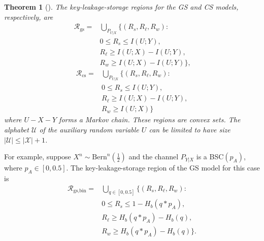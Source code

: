 \documentclass[journal,10pt,twoside]{IEEEtran}
\newtheorem{theorem}{Theorem}
\begin{document}
\begin{theorem}[\hspace{1sp}\cite{IgnaTrans}]\label{theo:secrecyregions}
The key-leakage-storage regions for the GS and CS models, respectively, are 
\begin{align}
\mathcal{R}_{\text{gs}}\! =\! &\bigcup_{P_{U|X}}\!\Big\{\left(R_s,R_\ell,R_w\right)\!\colon\!\nonumber\\
&0 \leq R_s\leq I(U;Y),\nonumber\\
&R_\ell\geq I(U;X)-I(U;Y),\nonumber\\
&R_w\geq I(U;X)-I(U;Y)\Big\} \text{,}\label{eq:regionGS}
\end{align}
\vspace*{-0.2cm}
\begin{align}
	\mathcal{R}_{\text{cs}}\! =\! &\bigcup_{P_{U|X}}\!\Big\{\left(R_s,R_\ell,R_w\right)\!\colon\! \nonumber\\
	&0 \leq R_s\leq I(U;Y),\nonumber\\
	&R_\ell\geq I(U;X)-I(U;Y),\nonumber\\
	&R_w\geq I(U;X)\Big\} \label{eq:regionCS}
\end{align}
where $U-X-Y$ forms a Markov chain. These regions are convex sets. The alphabet $\mathcal{U}$ of the auxiliary random variable $U$ can be limited to have size $\displaystyle |\mathcal{U}|\!\leq\!|\mathcal{X}|+1$.
\end{theorem}

For example, suppose $X^n\sim \text{Bern}^n(\frac{1}{2})$ and the channel $P_{Y|X}$ is a BSC$(p_A)$, where $p_A\in[0, 0.5]$. The key-leakage-storage region of the GS model for this case is \cite{IgnaTrans}
\begin{align}
\mathcal{R}_{\text{gs,bin}}\! =\! &\bigcup_{q\in[0,0.5]}\!\Big\{\left(R_s,R_\ell,R_w\right)\!\colon\!\nonumber\\
&0\leq R_s\leq 1- H_b(q*p_A),\nonumber\\
&R_\ell\geq H_b(q*p_A)- H_b(q),\nonumber\\
&R_w\geq H_b(q*p_A)- H_b(q)\Big\}\label{eq:BSCRegionGS}.
\end{align}
 
\end{document}
